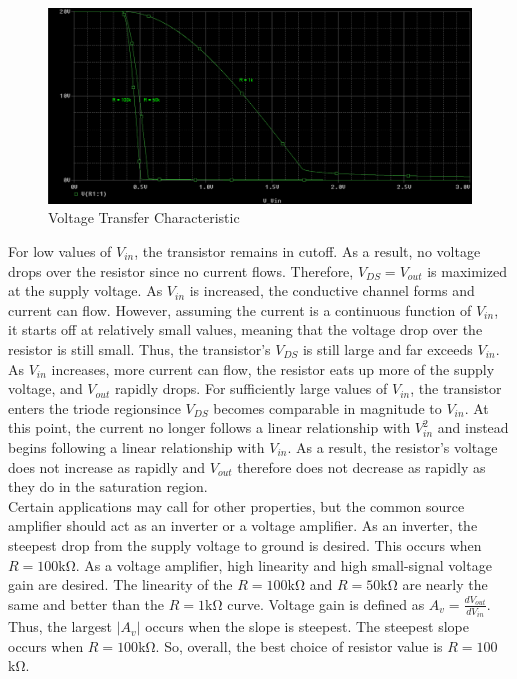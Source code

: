 \FloatBarrier

\begin{figure}[h!]
	\centering
	\includegraphics[scale=0.25]{../images/vout_vs_vin.PNG}
	\caption{Voltage Transfer Characteristic}
	\label{fig:vout_vs_vin}
\end{figure}

\FloatBarrier

For low values of $V_{in}$, the transistor remains in cutoff. As a result, no voltage drops over the resistor since no current flows. Therefore, $V_{DS} = V_{out}$ is maximized at the supply voltage. As $V_{in}$ is increased, the conductive channel forms and current can flow. However, assuming the current is a continuous function of $V_{in}$, it starts off at relatively small values, meaning that the voltage drop over the resistor is still small. Thus, the transistor's $V_{DS}$ is still large and far exceeds $V_{in}$. As $V_{in}$ increases, more current can flow, the resistor eats up more of the supply voltage, and $V_{out}$ rapidly drops. For sufficiently large values of $V_{in}$, the transistor enters the triode regionsince $V_{DS}$ becomes comparable in magnitude to $V_{in}$. At this point, the current no longer follows a linear relationship with $V_{in}^2$ and instead begins following a linear relationship with $V_{in}$. As a result, the resistor's voltage does not increase as rapidly and $V_{out}$ therefore does not decrease as rapidly as they do in the saturation region. \\

Certain applications may call for other properties, but the common source amplifier should act as an inverter or a voltage amplifier. As an inverter, the steepest drop from the supply voltage to ground is desired. This occurs when $R = 100$\si{\kilo\ohm}. As a voltage amplifier, high linearity and high small-signal voltage gain are desired. The linearity of the $R = 100$\si{\kilo\ohm} and $R = 50$\si{\kilo\ohm} are nearly the same and better than the $R = 1$\si{\kilo\ohm} curve. Voltage gain is defined as $A_v = \frac{dV_{out}}{dV_{in}}$. Thus, the largest $|A_v|$ occurs when the slope is steepest. The steepest slope occurs when $R = 100$\si{\kilo\ohm}. So, overall, the best choice of resistor value is $R = 100$\si{\kilo\ohm}. \\

